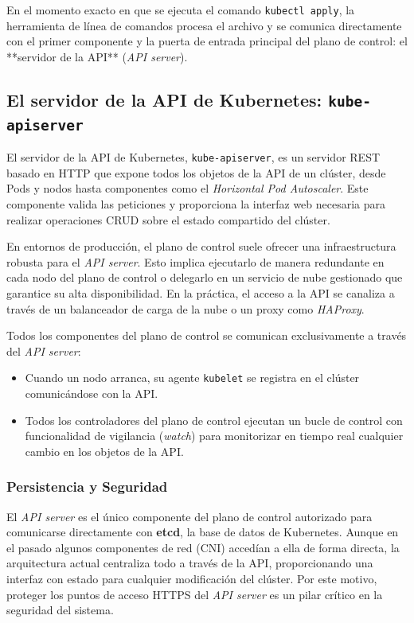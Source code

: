 En el momento exacto en que se ejecuta el comando \texttt{kubectl apply}, la herramienta de línea de comandos procesa el archivo y se comunica directamente con el primer componente y la puerta de entrada principal del plano de control: el **servidor de la API** (\textit{API server}).

\subsection{El servidor de la API de Kubernetes: \texttt{kube-apiserver}}

El servidor de la API de Kubernetes, \texttt{kube-apiserver}, es un servidor REST basado en HTTP que expone todos los objetos de la API de un clúster, desde Pods y nodos hasta componentes como el \textit{Horizontal Pod Autoscaler}. Este componente valida las peticiones y proporciona la interfaz web necesaria para realizar operaciones CRUD sobre el estado compartido del clúster. 

En entornos de producción, el plano de control suele ofrecer una infraestructura robusta para el \textit{API server}. Esto implica ejecutarlo de manera redundante en cada nodo del plano de control o delegarlo en un servicio de nube gestionado que garantice su alta disponibilidad. En la práctica, el acceso a la API se canaliza a través de un balanceador de carga de la nube o un proxy como \textit{HAProxy}.

Todos los componentes del plano de control se comunican exclusivamente a través del \textit{API server}:
\begin{itemize}
    \item Cuando un nodo arranca, su agente \texttt{kubelet} se registra en el clúster comunicándose con la API.
    \item Todos los controladores del plano de control ejecutan un bucle de control con funcionalidad de vigilancia (\textit{watch}) para monitorizar en tiempo real cualquier cambio en los objetos de la API.
\end{itemize}

\subsubsection{Persistencia y Seguridad}
El \textit{API server} es el único componente del plano de control autorizado para comunicarse directamente con \textbf{etcd}, la base de datos de Kubernetes. Aunque en el pasado algunos componentes de red (CNI) accedían a ella de forma directa, la arquitectura actual centraliza todo a través de la API, proporcionando una interfaz con estado para cualquier modificación del clúster. Por este motivo, proteger los puntos de acceso HTTPS del \textit{API server} es un pilar crítico en la seguridad del sistema.

